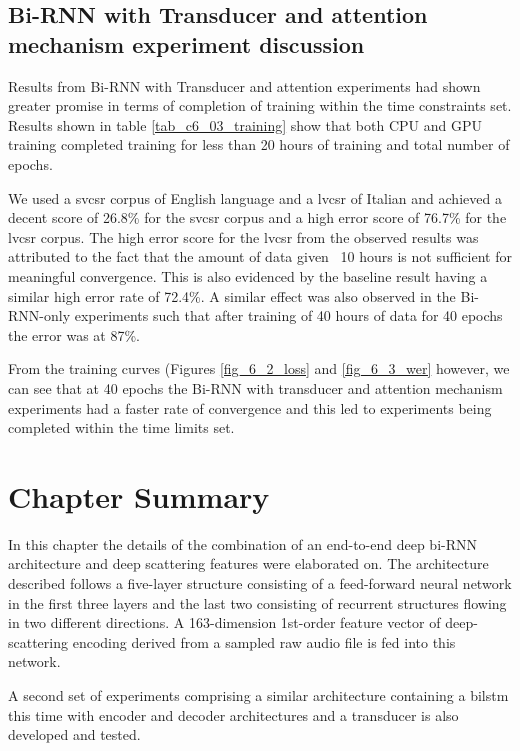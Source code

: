 {\subsection{Bi-RNN with Transducer and attention mechanism experiment discussion}
Results from Bi-RNN with Transducer and attention experiments had shown greater promise in terms of completion of training within the time constraints set. Results shown in table \ref{tab_c6_03_training} show that both CPU and GPU training completed training for less than 20 hours of training and total number of epochs.

We used a \acrfull{svcsr} corpus of English language and a \acrfull{lvcsr} of Italian and achieved a decent score of 26.8\% for the \acrshort{svcsr} corpus and a high error score of 76.7\% for the \acrshort{lvcsr} corpus.  The high error score for the \acrshort{lvcsr} from the observed results was attributed to the fact that the amount of data given ~10 hours is not sufficient for meaningful convergence.  This is also evidenced by the baseline result having a similar high error rate of 72.4\%.  A similar effect was also observed in the Bi-RNN-only experiments such that after training of 40 hours of data for 40 epochs the error was at 87\%.

From the training curves (Figures \ref{fig_6_2_loss} and \ref{fig_6_3_wer} however, we can see that at 40 epochs the Bi-RNN with transducer and attention mechanism experiments had a faster rate of convergence and this led to experiments being completed within the time limits set.

\section{Chapter Summary}

In this chapter the details of the combination of an end-to-end deep bi-RNN architecture and deep scattering features were elaborated on.  The architecture described follows a five-layer structure consisting of a feed-forward neural network in the first three layers and the last two consisting of recurrent structures flowing in two different directions.  A 163-dimension 1st-order feature vector of deep-scattering encoding derived from a sampled raw audio file is fed into this network.

A second set of experiments comprising a similar architecture containing a \acrshort{bilstm} this time with encoder and decoder architectures and a transducer is also developed and tested.

}
